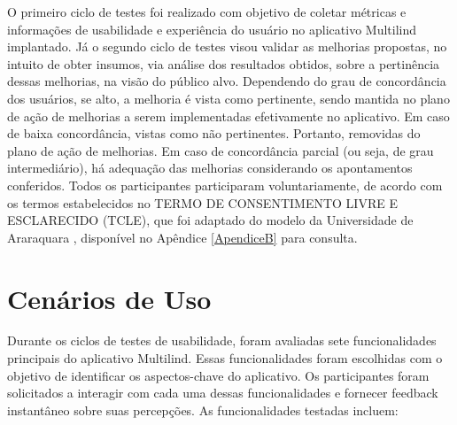 O primeiro ciclo de testes foi realizado com objetivo de coletar métricas e informações de usabilidade e experiência do usuário no aplicativo Multilind implantado. Já o segundo ciclo de testes visou validar as 
melhorias propostas, no intuito de obter insumos, via análise dos resultados obtidos, sobre a pertinência dessas melhorias, na visão do público alvo. Dependendo do grau de concordância dos usuários, se alto, a 
melhoria é vista como pertinente, sendo mantida no plano de ação de melhorias a serem implementadas efetivamente no aplicativo. Em caso de baixa concordância, vistas como não pertinentes. Portanto, removidas 
do plano de ação de melhorias. Em caso de concordância parcial (ou seja, de grau intermediário), há adequação das melhorias considerando os apontamentos conferidos. Todos os participantes participaram voluntariamente, 
de acordo com os termos estabelecidos no  TERMO DE CONSENTIMENTO LIVRE E ESCLARECIDO (TCLE), que foi adaptado do modelo da Universidade de Araraquara \cite{tcle}, disponível no Apêndice \ref{ApendiceB} para consulta.

\section{Cenários de Uso}
\label{sec:Cenários de Uso}
Durante os ciclos de testes de usabilidade, foram avaliadas sete funcionalidades principais do aplicativo Multilind. Essas funcionalidades foram escolhidas com o objetivo de identificar os aspectos-chave do 
aplicativo. Os participantes foram solicitados a interagir com cada uma dessas funcionalidades e fornecer feedback instantâneo sobre suas percepções. As funcionalidades testadas incluem:

